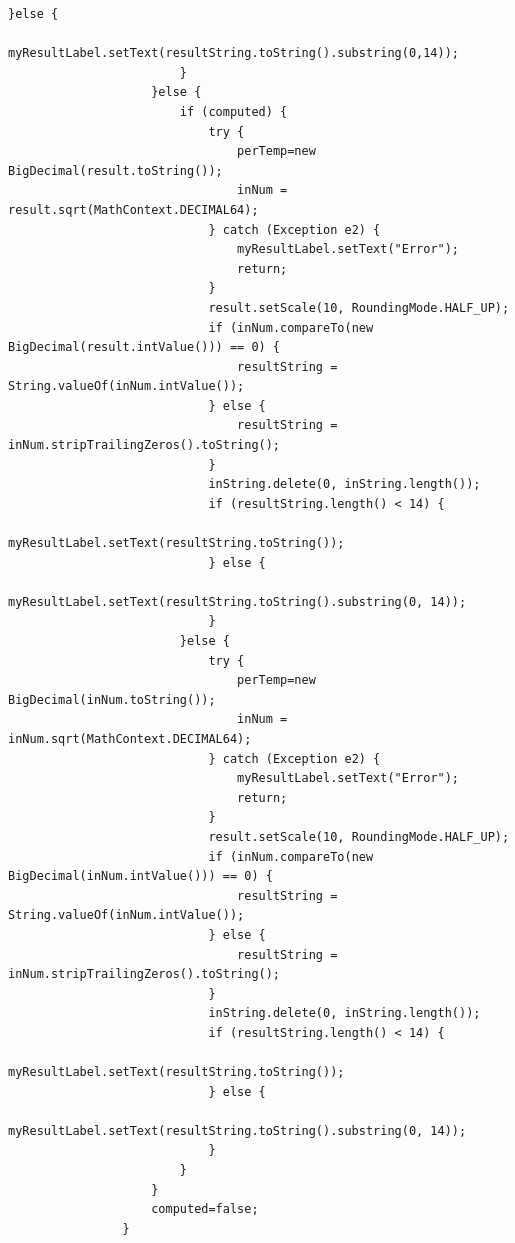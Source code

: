 \documentclass{ctexart}
\begin{document}
\begin{lstlisting}[caption=冗杂的代码]
                        }else {
                            myResultLabel.setText(resultString.toString().substring(0,14));
                        }
                    }else {
                        if (computed) {
                            try {
                                perTemp=new BigDecimal(result.toString());
                                inNum = result.sqrt(MathContext.DECIMAL64);
                            } catch (Exception e2) {
                                myResultLabel.setText("Error");
                                return;
                            }
                            result.setScale(10, RoundingMode.HALF_UP);
                            if (inNum.compareTo(new BigDecimal(result.intValue())) == 0) {
                                resultString = String.valueOf(inNum.intValue());
                            } else {
                                resultString = inNum.stripTrailingZeros().toString();
                            }
                            inString.delete(0, inString.length());
                            if (resultString.length() < 14) {
                                myResultLabel.setText(resultString.toString());
                            } else {
                                myResultLabel.setText(resultString.toString().substring(0, 14));
                            } 
                        }else {
                            try {
                                perTemp=new BigDecimal(inNum.toString());
                                inNum = inNum.sqrt(MathContext.DECIMAL64);
                            } catch (Exception e2) {
                                myResultLabel.setText("Error");
                                return;
                            }
                            result.setScale(10, RoundingMode.HALF_UP);
                            if (inNum.compareTo(new BigDecimal(inNum.intValue())) == 0) {
                                resultString = String.valueOf(inNum.intValue());
                            } else {
                                resultString = inNum.stripTrailingZeros().toString();
                            }
                            inString.delete(0, inString.length());
                            if (resultString.length() < 14) {
                                myResultLabel.setText(resultString.toString());
                            } else {
                                myResultLabel.setText(resultString.toString().substring(0, 14));
                            } 
                        }
                    }
                    computed=false;	
                }
                

\end{lstlisting}
\end{document}
